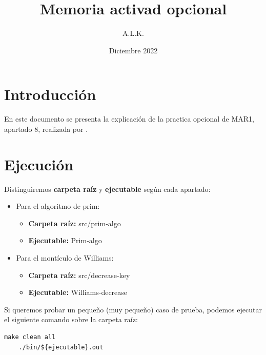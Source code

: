\documentclass[6pt]{AiTex}
\title{Memoria activad opcional}
\author{A.L.K.}
\date{Diciembre 2022}
\begin{document}
\justify


\section*{Introducción}

En este documento se presenta la explicación de la practica opcional de MAR1, apartado 8, realizada por \autor.

\begin{multicols}{2}

    
    \vfill
    \hfill

    
\end{multicols}

\newpage

\section{Ejecución}

Distinguiremos \textbf{carpeta raíz} y \textbf{ejecutable} según cada apartado:
\begin{itemize}
    \item Para el algoritmo de prim:
          \begin{itemize}
              \item\textbf{Carpeta raíz:} src/prim-algo
              \item\textbf{Ejecutable:} Prim-algo
          \end{itemize}
    \item Para el montículo de Williams:
          \begin{itemize}
              \item\textbf{Carpeta raíz:} src/decrease-key
              \item\textbf{Ejecutable:} Williams-decrease
          \end{itemize}
\end{itemize}

Si queremos probar un pequeño (muy pequeño) caso de prueba, podemos ejecutar el siguiente comando sobre la carpeta raíz:
\begin{lstlisting}[style=custombash]
    make clean all
    ./bin/${ejecutable}.out
    \end{lstlisting}
\end{document}

